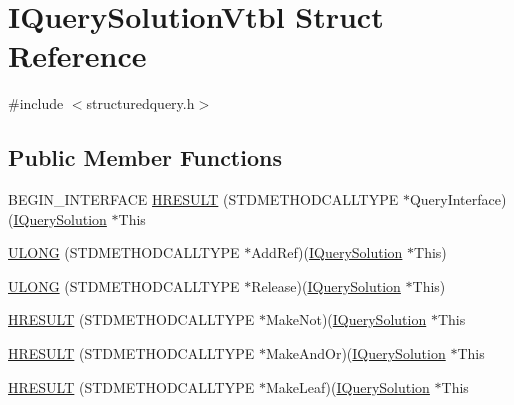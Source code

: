 \hypertarget{struct_i_query_solution_vtbl}{}\section{I\+Query\+Solution\+Vtbl Struct Reference}
\label{struct_i_query_solution_vtbl}


{\ttfamily \#include $<$structuredquery.\+h$>$}

\subsection*{Public Member Functions}
\begin{DoxyCompactItemize}
\item 
B\+E\+G\+I\+N\+\_\+\+I\+N\+T\+E\+R\+F\+A\+CE \hyperlink{struct_i_query_solution_vtbl_aa72bc1379a2c7cbce9f58c604377f694}{H\+R\+E\+S\+U\+LT} (S\+T\+D\+M\+E\+T\+H\+O\+D\+C\+A\+L\+L\+T\+Y\+PE $\ast$Query\+Interface)(\hyperlink{structuredquery_8h_a34bdc4e4bd6e4cc32567fef04b30b355}{I\+Query\+Solution} $\ast$This
\item 
\hyperlink{struct_i_query_solution_vtbl_a16fc582f36bdec6e74cdf8ed34fbb85d}{U\+L\+O\+NG} (S\+T\+D\+M\+E\+T\+H\+O\+D\+C\+A\+L\+L\+T\+Y\+PE $\ast$Add\+Ref)(\hyperlink{structuredquery_8h_a34bdc4e4bd6e4cc32567fef04b30b355}{I\+Query\+Solution} $\ast$This)
\item 
\hyperlink{struct_i_query_solution_vtbl_a2a5b1ef1990b84c05516359fcd4edfa6}{U\+L\+O\+NG} (S\+T\+D\+M\+E\+T\+H\+O\+D\+C\+A\+L\+L\+T\+Y\+PE $\ast$Release)(\hyperlink{structuredquery_8h_a34bdc4e4bd6e4cc32567fef04b30b355}{I\+Query\+Solution} $\ast$This)
\item 
\hyperlink{struct_i_query_solution_vtbl_acd0ed4ae9112c3fad0c61906e27cf3ef}{H\+R\+E\+S\+U\+LT} (S\+T\+D\+M\+E\+T\+H\+O\+D\+C\+A\+L\+L\+T\+Y\+PE $\ast$Make\+Not)(\hyperlink{structuredquery_8h_a34bdc4e4bd6e4cc32567fef04b30b355}{I\+Query\+Solution} $\ast$This
\item 
\hyperlink{struct_i_query_solution_vtbl_adfed13648c6badfc653434e662b2cada}{H\+R\+E\+S\+U\+LT} (S\+T\+D\+M\+E\+T\+H\+O\+D\+C\+A\+L\+L\+T\+Y\+PE $\ast$Make\+And\+Or)(\hyperlink{structuredquery_8h_a34bdc4e4bd6e4cc32567fef04b30b355}{I\+Query\+Solution} $\ast$This
\item 
\hyperlink{struct_i_query_solution_vtbl_af2ec1a4200fabc0cb2bae94f7a618496}{H\+R\+E\+S\+U\+LT} (S\+T\+D\+M\+E\+T\+H\+O\+D\+C\+A\+L\+L\+T\+Y\+PE $\ast$Make\+Leaf)(\hyperlink{structuredquery_8h_a34bdc4e4bd6e4cc32567fef04b30b355}{I\+Query\+Solution} $\ast$This

\end{DoxyCompactItemize}
